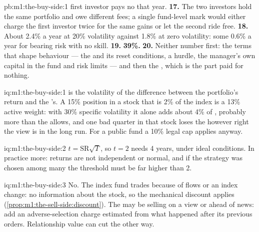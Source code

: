 \begin{solution}{pb:m1:the-buy-side:1}
first investor pays no  that year.
\textbf{17.} The two investors hold the same portfolio and owe different
fees; a single fund-level mark would either charge the first investor
twice for the same gains or let the second ride free.
\textbf{18.} About 2.4\% a year at 20\% volatility against 1.8\% at zero
volatility: some 0.6\% a year for bearing risk with no skill.
\textbf{19.} \textbf{39\%.}
\textbf{20.} Neither number first: the terms that shape behaviour --- the
 and its reset conditions, a hurdle, the manager's own
capital in the fund and risk limits --- and then the , which
is the part paid for nothing.
\end{solution}

\begin{solution}{iq:m1:the-buy-side:1}
 is the volatility of the difference between the portfolio's
return and the 's. A 15\% position in a stock that is 2\% of the
index is a 13\% active weight: with 30\% specific volatility it alone adds
about 4\% of , probably more than the  allows, and one
bad quarter in that stock loses the  however right the view is in
the long run. For a public fund a 10\% legal cap applies anyway.
\end{solution}

\begin{solution}{iq:m1:the-buy-side:2}
$t = \mathrm{SR}\sqrt{T}$, so $t = 2$ needs 4 years, under ideal
conditions. In practice more: returns are not independent or normal, and if
the strategy was chosen among many the threshold must be far higher than 2.
\end{solution}

\begin{solution}{iq:m1:the-buy-side:3}
No. The index fund trades because of flows or an index change: no
information about the stock, so the mechanical discount applies
(\cref{prop:m1:the-sell-side:discount}). The  may be selling on a
view or ahead of news: add an adverse-selection charge estimated from what
happened after its previous orders. Relationship value can cut the other
way.
\end{solution}

